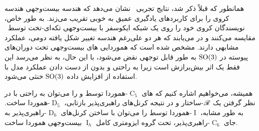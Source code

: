 همانطور که قبلاً ذکر شد، نتایج تجربی~\citet{kicanaoglu2019gaugeSphere} نشان می‌دهد که هندسه بیست‌وجهی هندسه کروی را برای کاربردهای یادگیری عمیق به خوبی تقریب می‌زند.
به طور خاص، نویسندگان  کروی خود را روی یک شبکه ایکوسفر با  بیست‌وجهی تکه‌ای-تخت توسط~\citet{gaugeIco2019} مقایسه می‌کنند و در می‌یابند که هر دو علی‌رغم هندسه تغییر شکل یافته دومی، عملکرد مشابهی دارند.
مشخص شده است که هموردایی های بیست‌وجهی تحت دوران‌های پیوسته در $\operatorname{SO}(3)$ به طور قابل توجهی نقض می‌شود، با این حال، به نظر می‌رسد این فقط یک اثر بیش‌برازش است زیرا به راحتی و بدون از دست دادن عملکرد مدل با استفاده از افزایش داده $\operatorname{SO}(3)$ خنثی می‌شود.


همیشه، می‌خواهیم اشاره کنیم که های $\operatorname{C}_5$-هموردا توسط \citet{liu2018icoAltAz} و \citet{zhang2019orientation} را می‌توان به راحتی با در نظر گرفتن یک $\mathscr{R}$-ساختار و در نتیجه کرنل‌های راهبری‌پذیر بازتابی، $\operatorname{D}_5$-هموردا ساخت.
به طور مشابه،  $\operatorname{I}$-هموردا توسط \citet{gaugeIco2019} را می‌توان با ساختن کرنل‌های $\operatorname{D}_6$-راهبری‌پذیر به جای $\operatorname{C}_6$-راهبری‌پذیر، تحت گروه ایزومتری کامل $\operatorname{I}_h$ بیست‌وجهی هموردا ساخت.